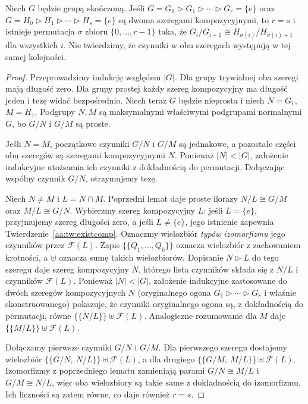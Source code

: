 \begin{twierdzenie}
\label{aa:tw:jordan-holder}
Niech $G$ będzie grupą skończoną. Jeśli
$G=G_0\triangleright G_1\triangleright\cdots\triangleright G_r=\{e\}$
oraz $G=H_0\triangleright H_1\triangleright\cdots\triangleright H_s=\{e\}$
są dwoma szeregami kompozycyjnymi, to $r=s$ i istnieje
permutacja $\sigma$ zbioru $\{0,\ldots,r-1\}$ taka, że
$G_i/G_{i+1}\cong H_{\sigma(i)}/H_{\sigma(i)+1}$
dla wszystkich $i$.
Nie twierdzimy, że czynniki w obu szeregach występują w tej samej kolejności.
\end{twierdzenie}
\begin{proof}
Przeprowadzimy indukcję względem $|G|$. Dla grupy trywialnej
oba szeregi mają długość zero. Dla grupy prostej każdy szereg
kompozycyjny ma długość jeden i tezę widać bezpośrednio.
Niech teraz $G$ będzie nieprosta i niech $N=G_1$, $M=H_1$.
Podgrupy $N,M$ są maksymalnymi właściwymi podgrupami normalnymi
$G$, bo $G/N$ i $G/M$ są proste.

Jeśli $N=M$, początkowe czynniki $G/N$ i $G/M$ są jednakowe,
a pozostałe części obu szeregów są szeregami kompozycyjnymi $N$.
Ponieważ $|N|<|G|$, założenie indukcyjne utożsamia ich
czynniki z dokładnością do permutacji. Dołączając wspólny czynnik
$G/N$, otrzymujemy tezę.

Niech $N\ne M$ i $L=N\cap M$.
Poprzedni lemat daje proste ilorazy
$N/L\cong G/M$ oraz $M/L\cong G/N$.
Wybierzmy szereg kompozycyjny $L$: jeśli $L=\{e\}$,
przyjmujemy szereg długości zero, a jeśli $L\ne\{e\}$,
jego istnienie zapewnia Twierdzenie~\ref{aa:tw:existcomp}.
Oznaczmy wielozbiór \emph{typów izomorfizmu} jego czynników
przez $\mathcal F(L)$. Zapis $\{\!\{Q_1,\ldots,Q_k\}\!\}$ oznacza wielozbiór
z zachowaniem krotności, a $\uplus$ oznacza sumę takich wielozbiorów.
Dopisanie $N\triangleright L$ do tego szeregu daje szereg
kompozycyjny $N$, którego lista czynników składa się
z $N/L$ i czynników $\mathcal F(L)$.
Ponieważ $|N|<|G|$, założenie indukcyjne zastosowane do dwóch
szeregów kompozycyjnych $N$ (oryginalnego ogona
$G_1\triangleright\cdots\triangleright G_r$
i właśnie skonstruowanego) pokazuje, że czynniki oryginalnego
ogona są, z dokładnością do permutacji, równe
$\{\!\{N/L\}\!\}\uplus\mathcal F(L)$.
Analogiczne rozumowanie dla $M$ daje
$\{\!\{M/L\}\!\}\uplus\mathcal F(L)$.

Dołączamy pierwsze czynniki $G/N$ i $G/M$.
Dla pierwszego szeregu dostajemy wielozbiór
$\{\!\{G/N,\ N/L\}\!\}\uplus\mathcal F(L)$,
a dla drugiego
$\{\!\{G/M,\ M/L\}\!\}\uplus\mathcal F(L)$.
Izomorfizmy z poprzedniego lematu zamieniają parami
$G/N\cong M/L$ i $G/M\cong N/L$, więc oba wielozbiory
są takie same z dokładnością do izomorfizmu. Ich liczności
są zatem równe, co daje również $r=s$.
\end{proof}

